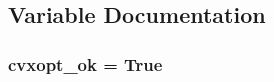 \subsection{Variable Documentation}
\hypertarget{namespacepyneb_1_1utils_1_1misc_a2bf67563887f4357206e155b78818e44}{
\subsubsection[{cvxopt\-\_\-ok}]{\setlength{\rightskip}{0pt plus 5cm}cvxopt\-\_\-ok = True}}\label{namespacepyneb_1_1utils_1_1misc_a2bf67563887f4357206e155b78818e44}

